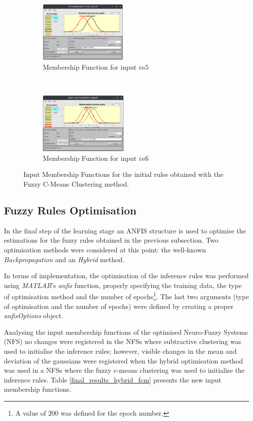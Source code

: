 \documentclass[11pt]{article}
\begin{document}
\begin{figure}[ht]
\begin{subfigure}[t]{0.3\textwidth}
		\includegraphics[height=1.2in]{images/fcm_in5}
		\caption{Membership Function for input $in5$}
	\end{subfigure}
	~
	\begin{subfigure}[t]{0.3\textwidth}
		\centering
		\includegraphics[height=1.2in]{images/fcm_in6}
		\caption{Membership Function for input $in6$}
	\end{subfigure}
	\caption{Input Membership Functions for the initial rules obtained with the Fuzzy C-Means Clustering method.}
\end{figure}

\subsection{Fuzzy Rules Optimisation}

In the final step of the learning stage an ANFIS structure is used to optimise the estimations for the fuzzy rules obtained in the previous subsection. Two optimisation methods were considered at this point: the well-known \emph{Backpropagation} and an \emph{Hybrid} method.

In terms of implementation, the optimisation of the inference rules was performed using \emph{MATLAB}'s \emph{anfis} function, properly specifying the training data, the type of optimisation method and the number of epochs\footnote{A value of $200$ was defined for the epoch number.}. The last two arguments (type of optimisation and the number of epochs) were defined by creating a proper \emph{anfisOptions} object.

Analysing the input membership functions of the optimised Neuro-Fuzzy Systems (NFS) no changes were registered in the NFSs where subtractive clustering was used to initialise the inference rules; however, visible changes in the mean and deviation of the gaussians were registered when the hybrid optimisation method was used in a NFSs where the fuzzy c-means clustering was used to initialise the inference rules. Table \ref{final_results_hybrid_fcm} presents the new input membership functions.
\end{document}
